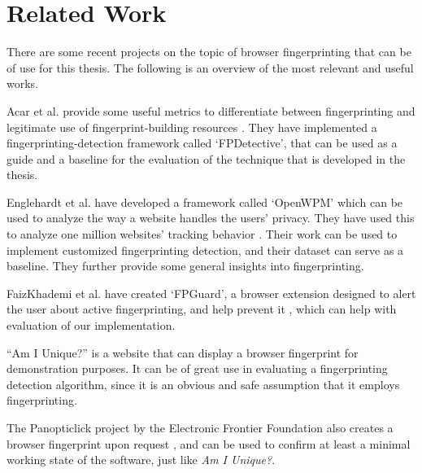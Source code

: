 \documentclass[
    fontsize=12pt,
    headings=small,
    parskip=half,
    bibliography=totoc,
    numbers=noenddot,
    open=any
    ]{scrreprt}
\begin{document}


\begingroup
\renewcommand{\cleardoublepage}{}
\renewcommand{\clearpage}{}
\chapter{Related Work} %
\endgroup

There are some recent projects on the topic of browser fingerprinting that can be of use for this thesis.
The following is an overview of the most relevant and useful works.

Acar et al. provide some useful metrics to differentiate between fingerprinting and legitimate use of
fingerprint-building resources \cite{DBLP:conf/ccs/AcarJNDGPP13}. They have implemented a fingerprinting-detection
framework called `FPDetective', that can be used as a guide and a baseline for the evaluation of the technique that is developed
in the thesis.

Englehardt et al. have developed a framework called `OpenWPM' which can be used to analyze the way a website
handles the users' privacy. They have used this to analyze one million websites' tracking behavior
\cite{DBLP:conf/ccs/EnglehardtN16}. Their work can be used to implement customized fingerprinting detection,
and their dataset can serve as a baseline. They further provide some general insights into fingerprinting.

FaizKhademi et al. have created `FPGuard', a browser extension designed to alert the user about active
fingerprinting, and help prevent it \cite{faizkhademi2015fpguard}, which can help with evaluation of our
implementation.

``Am I Unique?'' \cite{am_i_unique} is a website that can display a browser fingerprint for demonstration
purposes. It can be of great use in evaluating a fingerprinting detection algorithm, since it is an obvious and
safe assumption that it employs fingerprinting.

The Panopticlick project by the Electronic Frontier Foundation also creates a browser fingerprint upon request
\cite{panopticlick},
and can be used to confirm at least a minimal working state of the software, just like \textit{Am I Unique?}.
\end{document}
